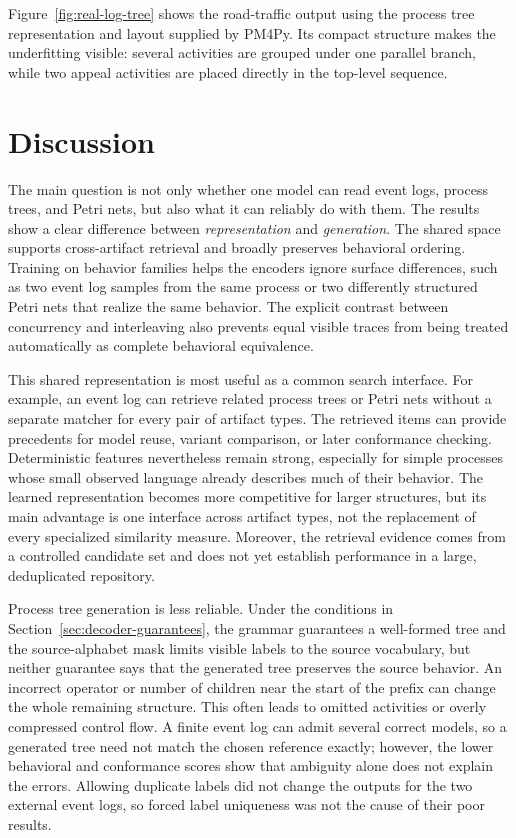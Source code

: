 \documentclass[mathematics,article,submit,moreauthors]{Definitions/mdpi}
\begin{document}
Figure~\ref{fig:real-log-tree} shows the road-traffic output using the process tree representation and layout supplied by PM4Py. Its compact structure makes the underfitting visible: several activities are grouped under one parallel branch, while two appeal activities are placed directly in the top-level sequence.





\section{Discussion}\label{sec:discussion}

The main question is not only whether one model can read event logs, process trees, and Petri nets, but also what it can reliably do with them. The results show a clear difference between \emph{representation} and \emph{generation}. The shared space supports cross-artifact retrieval and broadly preserves behavioral ordering. Training on behavior families helps the encoders ignore surface differences, such as two event log samples from the same process or two differently structured Petri nets that realize the same behavior. The explicit contrast between concurrency and interleaving also prevents equal visible traces from being treated automatically as complete behavioral equivalence.

This shared representation is most useful as a common search interface. For example, an event log can retrieve related process trees or Petri nets without a separate matcher for every pair of artifact types. The retrieved items can provide precedents for model reuse, variant comparison, or later conformance checking. Deterministic features nevertheless remain strong, especially for simple processes whose small observed language already describes much of their behavior. The learned representation becomes more competitive for larger structures, but its main advantage is one interface across artifact types, not the replacement of every specialized similarity measure. Moreover, the retrieval evidence comes from a controlled candidate set and does not yet establish performance in a large, deduplicated repository.

Process tree generation is less reliable. Under the conditions in Section~\ref{sec:decoder-guarantees}, the grammar guarantees a well-formed tree and the source-alphabet mask limits visible labels to the source vocabulary, but neither guarantee says that the generated tree preserves the source behavior. An incorrect operator or number of children near the start of the prefix can change the whole remaining structure. This often leads to omitted activities or overly compressed control flow. A finite event log can admit several correct models, so a generated tree need not match the chosen reference exactly; however, the lower behavioral and conformance scores show that ambiguity alone does not explain the errors. Allowing duplicate labels did not change the outputs for the two external event logs, so forced label uniqueness was not the cause of their poor results.
\end{document}
